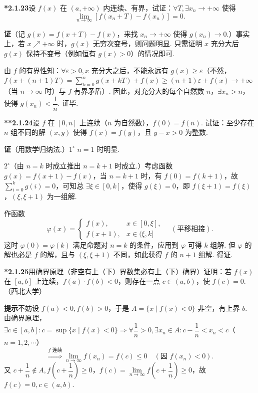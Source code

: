 \documentclass[UTF8, 12pt, fontset=fandol, oneside]{ctexart}
\begin{document}
\noindent\textbf{*2.1.23}\quad 设 $f(x)$ 在 $(a,+\infty)$ 内连续、有界，试证：$\forall T,\exists x_n\to+\infty$ 使得
\[
  \lim_{n\to\infty}[f(x_n+T)-f(x_n)]=0.
\]

\noindent\textbf{证}\quad （记 $g(x)=f(x+T)-f(x)$，来找 $x_n\to+\infty$ 使得 $g(x_n)\to0$.）事实上，若 $x\nearrow+\infty$ 时，$g(x)$ 无穷次变号，则问题明显. 只需证明 $x$ 充分大后 $g(x)$ 保持不变号（例如恒有 $g(x)>0$）的情况即可.

由 $f$ 的有界性知：$\forall\varepsilon>0,x$ 充分大之后，不能永远有 $g(x)\ge\varepsilon$（不然，$f(x+(n+1)T)=\sum\limits_{k=0}^{n}g(x+kT)+f(x)\ge(n+1)\varepsilon+f(x)\to+\infty$（当 $n\to\infty$ 时）与 $f$ 有界矛盾）. 因此，对充分大的每个自然数 $n$，$\exists x_n>n$，使得 $g(x_n)<\dfrac1n$. 证毕.

\noindent\textbf{**2.1.24}\quad 设 $f$ 在 $[0,n]$ 上连续（$n$ 为自然数），$f(0)=f(n)$. 试证：至少存在 $n$ 组不同的解 $(x,y)$ 使得 $f(x)=f(y)$，且 $y-x>0$ 为整数.

\noindent\textbf{证}\quad （用数学归纳法.）$1^\circ$ $n=1$ 时明显.

$2^\circ$（由 $n=k$ 时成立推出 $n=k+1$ 时成立.）考虑函数 $g(x)=f(x+1)-f(x)$，当 $n=k+1$ 时，有 $f(0)=f(k+1)$，故 $\sum\limits_{i=0}^{k}g(i)=0$，可知总 $\exists\xi\in[0,k]$，使得 $g(\xi)=0$，即 $f(\xi+1)=f(\xi)$，$(\xi,\xi+1)$ 为一组解.

作函数
\[
  \varphi(x)=
  \begin{cases}
    f(x), & x\in[0,\xi],\\
    f(x+1), & x\in(\xi,k]
  \end{cases}
\quad(\text{平移相接}).
\]
这时 $\varphi(0)=\varphi(k)$ 满足命题对 $n=k$ 的条件，应用到 $\varphi$ 可得 $k$ 组解. 但 $\varphi$ 的解也必是 $f$ 的解，且与 $(\xi,\xi+1)$ 不同，如此获得 $f$ 的 $n+1$ 组解. 得证.

\noindent\textbf{*2.1.25}\quad 用确界原理（非空有上（下）界数集必有上（下）确界）证明：若 $f(x)$ 在 $[a,b]$ 上连续，$f(a)\cdot f(b)<0$，则存在一点 $c\in(a,b)$，使 $f(c)=0$.（西北大学）

\noindent\textbf{提示}\quad 不妨设 $f(a)<0,f(b)>0$，于是 $A=\{x\mid f(x)<0\}$ 非空，有上界 $b$. 由确界原理，$\exists c\in[a,b]:c=\sup\{x\mid f(x)<0\}\Rightarrow \forall\dfrac1n>0,\exists x_n\in A:c-\dfrac1n<x_n<c$（$n=1,2,\cdots$）
\[
  \overset{f\text{ 连续}}{\Longrightarrow}\lim_{n\to\infty}f(x_n)=f(c)\le0\quad(\text{因 }f(x_n)<0).
\]
又 $c+\dfrac1n\notin A,f\left(c+\dfrac1n\right)\ge0$，$f(c)=\lim\limits_{n\to\infty}f\left(c+\dfrac1n\right)\ge0$，故 $f(c)=0,c\in(a,b)$.
\end{document}

